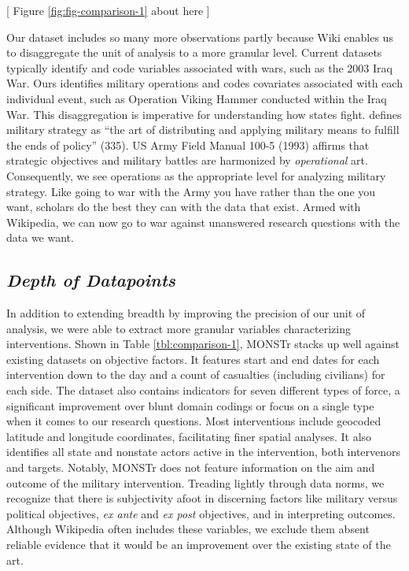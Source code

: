 \documentclass[fleqn,12pt]{article}
\begin{document}
\begin{center}
    [ Figure \ref{fig:fig-comparison-1} about here ]
\end{center}

Our dataset includes so many more observations partly because Wiki enables us to disaggregate the unit of analysis to a more granular level. Current datasets typically identify and code variables associated with wars, such as the 2003 Iraq War. Ours identifies military operations and codes covariates associated with each individual event, such as Operation Viking Hammer conducted within the Iraq War. This disaggregation is imperative for understanding how states fight. \citet{Hart62} defines military strategy as ``the art of distributing and applying military means to fulfill the ends of policy” (335). US Army Field Manual 100-5 (1993) affirms that strategic objectives and military battles are harmonized by \textit{operational} art. Consequently, we see operations as the appropriate level for analyzing military strategy. Like going to war with the Army you have rather than the one you want, scholars do the best they can with the data that exist. Armed with Wikipedia, we can now go to war against unanswered research questions with the data we want.

\subsection*{\textit{Depth of Datapoints}}
In addition to extending breadth by improving the precision of our unit of analysis, we were able to extract more granular variables characterizing interventions. Shown in Table \ref{tbl:comparison-1}, MONSTr stacks up well against existing datasets on objective factors. It features start and end dates for each intervention down to the day and a count of casualties (including civilians) for each side. The dataset also contains indicators for seven different types of force, a significant improvement over blunt domain codings or focus on a single type when it comes to our research questions. Most interventions include geocoded latitude and longitude coordinates, facilitating finer spatial analyses. It also identifies all state and nonstate actors active in the intervention, both intervenors and targets. Notably, MONSTr does not feature information on the aim and outcome of the military intervention. Treading lightly through data norms, we recognize that there is subjectivity afoot in discerning factors like military versus political objectives, \textit{ex ante} and \textit{ex post} objectives, and in interpreting outcomes. Although Wikipedia often includes these variables, we exclude them absent reliable evidence that it would be an improvement over the existing state of the art.
\end{document}
